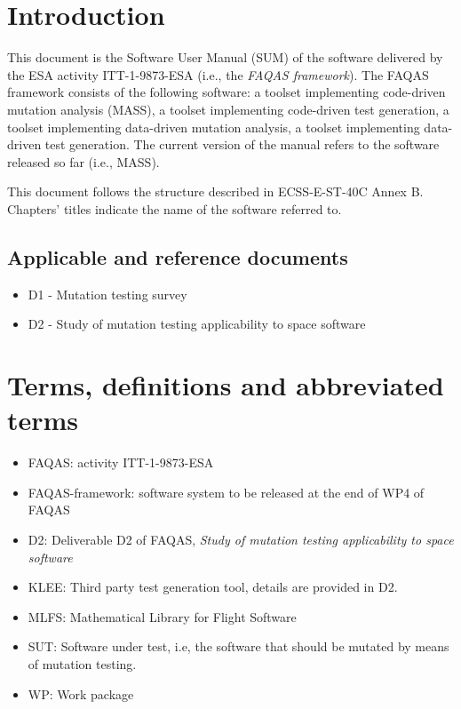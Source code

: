 
\chapter{Introduction}

This document is the Software User Manual (SUM) of the software delivered by the ESA activity ITT-1-9873-ESA (i.e., the \emph{FAQAS framework}).
The FAQAS framework consists of the following software: a toolset  implementing code-driven mutation analysis (MASS), a toolset implementing code-driven test generation, a toolset implementing data-driven mutation analysis, a toolset implementing data-driven test generation. The current version of the manual refers to the software released so far (i.e., MASS).

This document follows the structure described in ECSS-E-ST-40C Annex B. Chapters' titles indicate the name of the software referred to.
 
 
 
\section{Applicable and reference documents}

\begin{itemize}
\item{D1 - Mutation testing survey}
\item{D2 - Study of mutation testing applicability to space software}
\end{itemize}

\chapter{Terms, definitions and abbreviated terms}

\begin{itemize}
\item{FAQAS}: activity ITT-1-9873-ESA
\item{FAQAS-framework}: software system to be released at the end of WP4 of FAQAS
\item{D2}: Deliverable D2 of FAQAS, \emph{Study of mutation testing applicability to space software}
\item{KLEE}: Third party test generation tool, details are provided in D2.
\item{MLFS}: Mathematical Library for Flight Software
\item{SUT}: Software under test, i.e, the software that should be mutated by means of mutation testing.
\item{WP}: Work package

\end{itemize}

\clearpage
 

